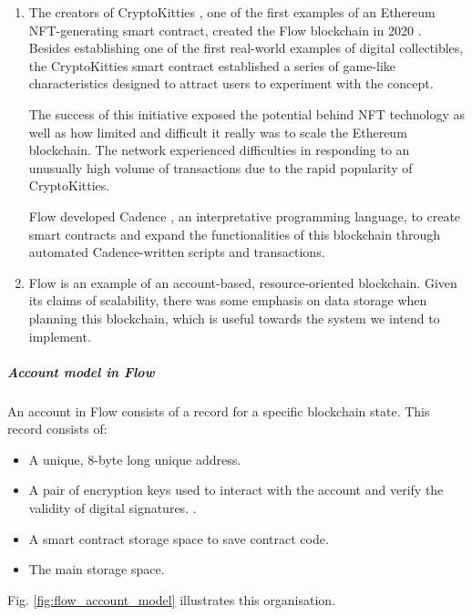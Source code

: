 \documentclass[./4_GeneralApproach.tex]{subfiles}
\begin{document}
\begin{enumerate}
    \item{The creators of CryptoKitties \cite{Gharegozlou2019}, one of the first examples of an Ethereum NFT-generating smart contract, created the Flow blockchain in 2020 \cite{Hentschel2019}. Besides establishing one of the first real-world examples of digital collectibles, the CryptoKitties smart contract established a series of game-like characteristics designed to attract users to experiment with the concept.
          \par
          The success of this initiative exposed the potential behind NFT technology as well as how limited and difficult it really was to scale the Ethereum blockchain. The network experienced difficulties in responding to an unusually high volume of transactions due to the rapid popularity of CryptoKitties.
          \par
          Flow developed Cadence \cite{Cadence2023}, an interpretative programming language, to create smart contracts and expand the functionalities of this blockchain through automated Cadence-written scripts and transactions.}

    \item{Flow is an example of an account-based, resource-oriented blockchain. Given its claims of scalability, there was some emphasis on data storage when planning this blockchain, which is useful towards the system we intend to implement.}

\end{enumerate}

\subparagraph{Account model in Flow}
\label{flow_accounts}
An account in Flow consists of a record for a specific blockchain state. This record consists of:

\begin{itemize}
    \item{A unique, 8-byte long unique address.}
    \item{A pair of encryption keys used to interact with the account and verify the validity of digital signatures. \cite{flow2024}}.
    \item{A smart contract storage space to save contract code.}
    \item{The main storage space.}
\end{itemize}

Fig. \ref{fig:flow_account_model} illustrates this organisation.
\end{document}

